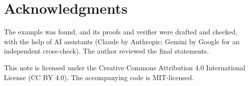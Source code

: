 \documentclass[11pt,a4paper]{article}
\begin{document}
\section*{Acknowledgments}
The example was found, and its proofs and verifier were drafted and checked, with the help of AI assistants (Claude by Anthropic; Gemini by Google for an independent cross-check). The author reviewed the final statements.



\vfill
\noindent\small This note is licensed under the Creative Commons Attribution 4.0 International License (CC BY 4.0). The accompanying code is MIT-licensed.
\end{document}
